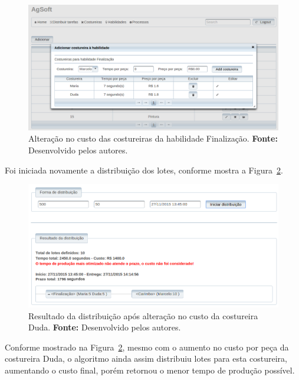 \begin{figure}[h!]
	\centerline{\includegraphics[width=14.7cm]{./imagens/alterecao_custo_teste6.png}}
	\caption[Alteração no custo das costureiras da habilidade Finalização.] 
	{Alteração no custo das costureiras da habilidade Finalização. \textbf{Fonte:} Desenvolvido pelos
		autores.}
	\label{fig:alterecao_custotcseis}
\end{figure}

\par Foi iniciada novamente a distribuição dos lotes, conforme mostra a
Figura~\ref{fig:resultado2_teste6}.

\newpage

\begin{figure}[h!]
	\centerline{\includegraphics[width=14.7cm]{./imagens/resultado2_teste6.png}}
	\caption[Resultado da distribuição após alteração no custo da costureira Duda.] 
	{Resultado da distribuição após alteração no custo da costureira Duda. \textbf{Fonte:} Desenvolvido pelos
	autores.}
	\label{fig:resultado2_teste6}
\end{figure}

\par Conforme mostrado na Figura~\ref{fig:resultado2_teste6}, mesmo com o
aumento no custo por peça da costureira Duda, o algoritmo ainda assim distribuiu
lotes para esta costureira, aumentando o custo final, porém retornou o
menor tempo de produção possível.
